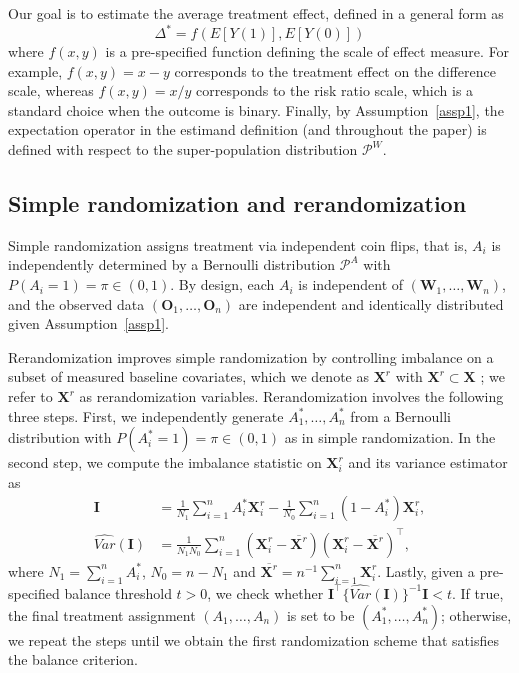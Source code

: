 \documentclass[12pt]{article}
\newcommand{\bX}{\boldsymbol{X}}\newcommand{\bO}{\boldsymbol{O}}
\newcommand{\bW}{\boldsymbol{W}}
\newcommand{\bI}{\boldsymbol{I}}
\begin{document}
Our goal is to estimate the average treatment effect, defined in a general form as
\begin{equation*}
    \Delta^* = f(E[Y(1)], E[Y(0)])
\end{equation*}
where $f(x,y)$ is a pre-specified function defining the scale of effect measure. For example, $f(x,y) = x-y$ corresponds to the treatment effect on the difference scale, whereas $f(x,y) = x/y$ corresponds to the risk ratio scale, which is a standard choice when the outcome is binary. 
Finally, by Assumption~\ref{assp1}, the expectation operator in the estimand definition (and throughout the paper) is defined with respect to the super-population distribution $\mathcal{P}^W$.

\subsection{Simple randomization and rerandomization}\label{sec: trt-assign}
Simple randomization assigns treatment via independent coin flips, that is, $A_i$ is independently determined by a Bernoulli distribution $\mathcal{P}^A$ with $P(A_i=1)=\pi\in (0,1)$.  By design, each $A_i$ is independent of $(\bW_1,\dots, \bW_n)$, and the observed data $(\bO_1,\dots, \bO_n)$ are independent and identically distributed given Assumption~\ref{assp1}.

Rerandomization improves simple randomization by controlling imbalance on a subset of measured baseline covariates, which we denote as $\bX^r$ with $\bX^r \subset \bX$ \citep{morgan2012rerandomization}; we refer to $\bX^r$ as rerandomization variables.  
Rerandomization involves the following three steps. First, we independently generate $A_1^*,\dots, A_n^*$ from a Bernoulli distribution with $P(A_i^*=1) = \pi\in (0,1)$ as in simple randomization. In the second step, we compute the imbalance statistic on $\bX^r_i$ and its variance estimator as
\begin{align*}
    \bI &= \frac{1}{N_1} \sum_{i=1}^n A^*_i \bX^r_i - \frac{1}{N_0} \sum_{i=1}^n (1-A_i^*) \bX^r_i, \\
    \widehat{Var}(\bI) &= \frac{1}{N_1N_0} \sum_{i=1}^n (\bX^r_i - \overline{\bX^r})(\bX^r_i - \overline{\bX^r})^\top,
\end{align*}
where $N_1 = \sum_{i=1}^n A_i^*$,  $N_0 = n - N_1$ and $\overline{\bX^r} = n^{-1} \sum_{i=1}^n \bX^r_i$. Lastly, given a pre-specified balance threshold $t >0$, we check whether $\bI^\top \{\widehat{Var}(\bI)\}^{-1} \bI < t$. If true, the final treatment assignment $(A_1,\dots, A_n)$ is set to be $(A_1^*,\dots, A_n^*)$; otherwise, we repeat the steps until we obtain the first randomization scheme that satisfies the balance criterion. 
\end{document}
